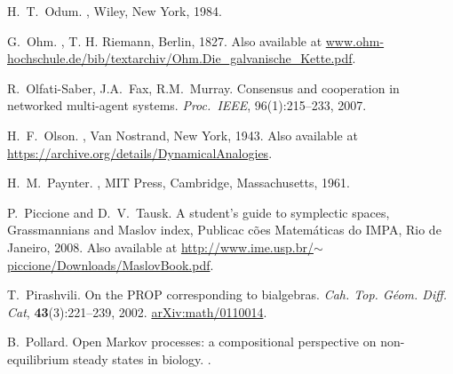 \begin{thebibliography}{RSW00}
    H.\ T.\ Odum.
    , Wiley, New York, 1984.

    G.\ Ohm.
    ,
    T. H. Riemann, Berlin, 1827.
    \newblock Also available at
    \href{http://www.ohm-hochschule.de/bib/textarchiv/Ohm.Die_galvanische_Kette.pdf}{www.ohm-hochschule.de/bib/textarchiv/Ohm.Die\_galvanische\_Kette.pdf}.

    R.\ Olfati-Saber, J.A.\ Fax, R.M.\ Murray.
    \newblock Consensus and cooperation in networked multi-agent systems.
    \newblock \emph{Proc.\ IEEE}, 96(1):215--233, 2007.

    H.\ F.\ Olson.
    , Van
    Nostrand, New York, 1943.
    \newblock Also available at 
    \href{https://archive.org/details/DynamicalAnalogies}
    {https://archive.org/details/DynamicalAnalogies}.


    H.\ M.\ Paynter.
    , MIT Press, Cambridge, Massachusetts, 1961.


    P.\ Piccione and D.\ V.\ Tausk.
    \newblock A student's guide to symplectic
    spaces, Grassmannians and Maslov index, Publicac c\~oes Matem\'aticas do
    IMPA, Rio de Janeiro, 2008.
    \newblock Also available at
    \href{http://www.ime.usp.br/~piccione/Downloads/MaslovBook.pdf}
    {http://www.ime.usp.br/$\sim$piccione/Downloads/MaslovBook.pdf}.

    T.\ Pirashvili.
    \newblock On the PROP corresponding to bialgebras.
    \newblock 
    \emph{Cah. Top. G\'{e}om. Diff. Cat}, {\bf 43}(3):221--239, 2002.
    \newblock 
    \href{http://arxiv.org/abs/math/0110014}{arXiv:math/0110014}.

    B.\ Pollard.
    \newblock Open Markov processes: a compositional
    perspective on non-equilibrium steady states in biology.
    .


\end{thebibliography}
